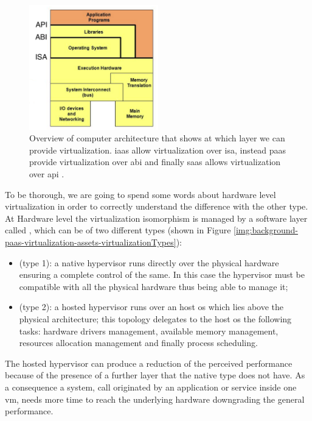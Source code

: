 \begin{figure}
	\centering{}
	\includegraphics[width=0.5\textwidth]{chapters/background/images/computing-virtualization.png}
	\caption[Different computing virtualization levels]{Overview of computer architecture that shows at
		which layer we can provide virtualization. \acf{iaas} allow virtualization over \acf{isa}, instead
		\ac{paas} provide virtualization over \acf{abi} and finally \ac{saas} allows virtualization over
		\ac{api} \cite{virtualizationLevel}.}
	\label{img:background-paas-virtualization-assets-virtualizationLevels}
\end{figure}

To be thorough, we are going to spend some words about hardware level virtualization in order to correctly
understand the difference with the other type. At Hardware level the virtualization isomorphism is managed
by a software layer called , which can be of two different types (shown in Figure 
\ref{img:background-paas-virtualization-assets-virtualizationTypes}):

\begin{itemize}
	\item{ (type 1): a native hypervisor runs directly over the physical hardware ensuring
		a complete control of the same. In this case the hypervisor must be compatible with all the physical
		hardware thus being able to manage it;}
	\item{ (type 2): a hosted hypervisor runs over an host \acs{os} which lies above the
		physical architecture; this topology delegates to the host \acs{os} the following tasks: hardware
		drivers management, available memory management, resources allocation management and finally process
		scheduling.}
\end{itemize}

The hosted hypervisor can produce a reduction of the perceived performance because of the presence of a 
further layer that the native type does not have. As a consequence a system, call originated by an 
application or service inside one \ac{vm}, needs more time to reach the underlying hardware downgrading 
the general performance.

